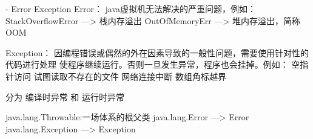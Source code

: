 - Error Exception
    Error：
        java虚拟机无法解决的严重问题，例如：
            StackOverflowError ---> 栈内存溢出
            OutOfMemoryErr ---> 堆内存溢出，简称OOM

    Exception：
        因编程错误或偶然的外在因素导致的一般性问题，需要使用针对性的代码进行处理
        使程序继续运行。否则一旦发生异常，程序也会挂掉。例如：
            空指针访问
            试图读取不存在的文件
            网络连接中断
            数组角标越界

        分为 编译时异常 和 运行时异常

    java.lang.Throwable:一场体系的根父类
        java.lang.Error ---> Error
        java.lang.Exception ---> Exception
